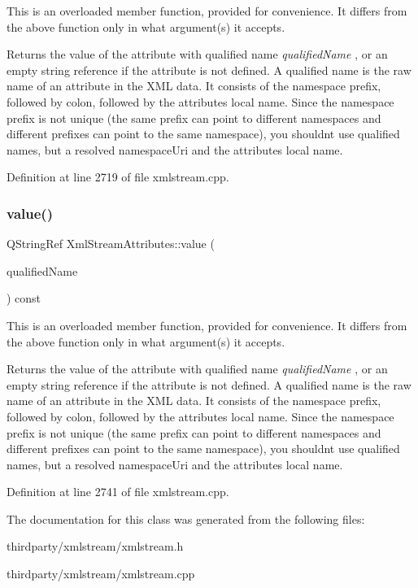This is an overloaded member function, provided for convenience. It differs from the above function only in what argument(s) it accepts.

Returns the value of the attribute with qualified name {\itshape qualified\+Name} , or an empty string reference if the attribute is not defined. A qualified name is the raw name of an attribute in the X\+ML data. It consists of the namespace prefix, followed by colon, followed by the attribute\textquotesingle{}s local name. Since the namespace prefix is not unique (the same prefix can point to different namespaces and different prefixes can point to the same namespace), you shouldn\textquotesingle{}t use qualified names, but a resolved namespace\+Uri and the attribute\textquotesingle{}s local name. 

Definition at line 2719 of file xmlstream.\+cpp.

\mbox{\label{class_xml_stream_attributes_ac783484006b66fe5c4af1c0f6aba1976}} 
\subsubsection{\texorpdfstring{value()}{value()}\hspace{0.1cm}{\footnotesize\ttfamily [5/5]}}
{\footnotesize\ttfamily Q\+String\+Ref Xml\+Stream\+Attributes\+::value (\begin{DoxyParamCaption}\item[{Q\+Latin1\+String}]{qualified\+Name }\end{DoxyParamCaption}) const}

This is an overloaded member function, provided for convenience. It differs from the above function only in what argument(s) it accepts.

Returns the value of the attribute with qualified name {\itshape qualified\+Name} , or an empty string reference if the attribute is not defined. A qualified name is the raw name of an attribute in the X\+ML data. It consists of the namespace prefix, followed by colon, followed by the attribute\textquotesingle{}s local name. Since the namespace prefix is not unique (the same prefix can point to different namespaces and different prefixes can point to the same namespace), you shouldn\textquotesingle{}t use qualified names, but a resolved namespace\+Uri and the attribute\textquotesingle{}s local name. 

Definition at line 2741 of file xmlstream.\+cpp.



The documentation for this class was generated from the following files\+:\begin{DoxyCompactItemize}
\item 
thirdparty/xmlstream/xmlstream.\+h\item 
thirdparty/xmlstream/xmlstream.\+cpp\end{DoxyCompactItemize}
